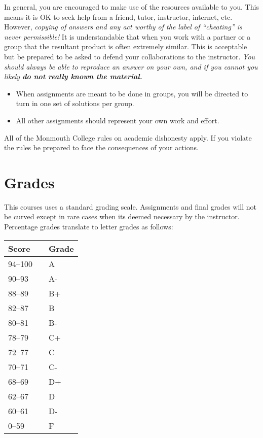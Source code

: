 \documentclass[nobib]{tufte-handout}
\begin{document}
In general, you are encouraged to make use of the resources available to you.  This means it is OK to seek help from a friend, tutor, instructor, internet, etc.  However, \textit{copying of answers and any act worthy of the label of ``cheating'' is never permissible!}  It is understandable that when you work with a partner or a group that the resultant product is often extremely similar.  This is acceptable but be prepared to be asked to defend your collaborations to the instructor.  \textit{You should always be able to reproduce an answer on your own, and if you cannot you likely \textbf{do not really known the material.}}
\begin{itemize}
\item When assignments are meant to be done in groups, you will be directed to turn in one set of solutions per group.
\item All other assignments should represent your own work and effort.
\end{itemize}
All of the Monmouth College rules on academic dishonesty apply.  If you violate the rules be prepared to face the consequences of your actions.


\newpage
\section{Grades}

This courses uses a standard grading scale.  Assignments and final grades will not be curved except in rare cases when its deemed necessary by the instructor.  Percentage grades translate to letter grades as follows:

\begin{center}
\begin{small}
\begin{tabular}{lcl}
Score & & Grade \\ \toprule
94--100 & & A \\
90--93 & & A- \\
88--89 & & B+ \\
82--87 & & B \\
80--81 & & B- \\
78--79 & & C+ \\
72--77 & & C \\
70--71 & & C- \\
68--69 & & D+ \\
62--67 & & D \\
60--61 & & D- \\
0--59 & & F
\end{tabular}
\end{small}
\end{center}
\end{document}
